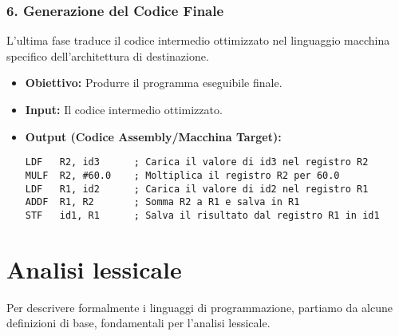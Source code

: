 \documentclass[a4paper, 11pt]{article}
\begin{document}
\subsubsection{6. Generazione del Codice Finale}
L'ultima fase traduce il codice intermedio ottimizzato nel linguaggio macchina specifico dell'architettura di destinazione.
\begin{itemize}
    \item \textbf{Obiettivo:} Produrre il programma eseguibile finale.
    \item \textbf{Input:} Il codice intermedio ottimizzato.
    \item \textbf{Output (Codice Assembly/Macchina Target):}
    \begin{Verbatim}[frame=single, label=Codice Assembly di Esempio]
LDF   R2, id3      ; Carica il valore di id3 nel registro R2
MULF  R2, #60.0    ; Moltiplica il registro R2 per 60.0
LDF   R1, id2      ; Carica il valore di id2 nel registro R1
ADDF  R1, R2       ; Somma R2 a R1 e salva in R1
STF   id1, R1      ; Salva il risultato dal registro R1 in id1
    \end{Verbatim}
\end{itemize}

\section{Analisi lessicale}

Per descrivere formalmente i linguaggi di programmazione, partiamo da alcune definizioni di base, fondamentali per l'analisi lessicale.
\end{document}
